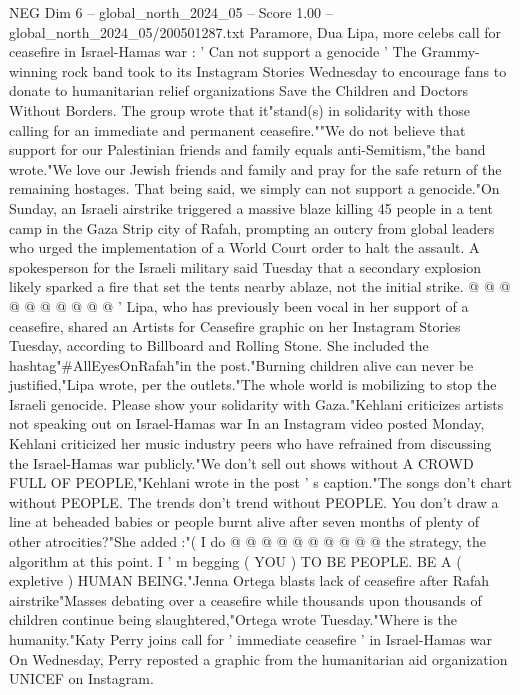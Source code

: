 \begin{textsample}{NEG Dim 6 – global\_north\_2024\_05 – Score 1.00 – global\_north\_2024\_05/200501287.txt}  \label{ex:f6_neg_304}
Paramore, Dua Lipa, more celebs call for ceasefire in Israel-Hamas war : ' Can not support a genocide ' The Grammy-winning rock band took to its Instagram Stories Wednesday to encourage fans to donate to humanitarian relief organizations Save the Children and Doctors Without Borders.
The group wrote that it"stand(s) in solidarity with those calling for an immediate and permanent ceasefire.""We do not believe that support for our Palestinian friends and family equals anti-Semitism,"the band wrote."We love our Jewish friends and family and pray for the safe return of the remaining hostages.
That being said, we simply can not support a genocide."On Sunday, an Israeli airstrike triggered a massive blaze killing 45 people in a tent camp in the Gaza Strip city of Rafah, prompting an outcry from global leaders who urged the implementation of a World Court order to halt the assault.
A spokesperson for the Israeli military said Tuesday that a secondary explosion likely sparked a fire that set the tents nearby ablaze, not the initial strike. @ @ @ @ @ @ @ @ @ @ ' Lipa, who has previously been vocal in her support of a ceasefire, shared an Artists for Ceasefire graphic on her Instagram Stories Tuesday, according to Billboard and Rolling Stone.
She included the hashtag"\#AllEyesOnRafah"in the post."Burning children alive can never be justified,"Lipa wrote, per the outlets."The whole world is mobilizing to stop the Israeli genocide.
Please show your solidarity with Gaza."Kehlani criticizes artists not speaking out on Israel-Hamas war In an Instagram video posted Monday, Kehlani criticized her music industry peers who have refrained from discussing the Israel-Hamas war publicly."We don't sell out shows without A CROWD FULL OF PEOPLE,"Kehlani wrote in the post ' s caption."The songs don't chart without PEOPLE.
The trends don't trend without PEOPLE.
You don't draw a line at beheaded babies or people burnt alive after seven months of plenty of other atrocities?"She added :"( I do @ @ @ @ @ @ @ @ @ @ the strategy, the algorithm at this point.
I ' m begging ( YOU ) TO BE PEOPLE.
BE A ( expletive ) HUMAN BEING."Jenna Ortega blasts lack of ceasefire after Rafah airstrike"Masses debating over a ceasefire while thousands upon thousands of children continue being slaughtered,"Ortega wrote Tuesday."Where is the humanity."Katy Perry joins call for ' immediate ceasefire ' in Israel-Hamas war On Wednesday, Perry reposted a graphic from the humanitarian aid organization UNICEF on Instagram.

\end{textsample}
